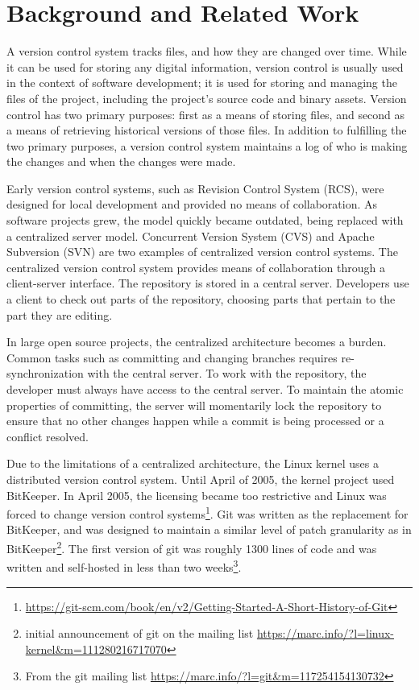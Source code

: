 \chapter{Background and Related Work}\label{chap:background}

A version control system tracks files, and how they are changed over
time.
While it can be used for storing any digital information,
version control is usually used in the context of software development;
it is used for storing and managing the files of the project, including
the project's source code and binary assets.
Version control has two primary purposes: first as a means of storing
files, and second as a means of retrieving historical versions of those
files.
In addition to fulfilling the two primary purposes, a version control
system maintains a log of who is making the changes and when the
changes were made.

Early version control systems, such as Revision Control System (RCS),
were designed for local development and provided no means of collaboration.
As software projects grew, the model quickly became outdated,
being replaced with a centralized server model.
Concurrent Version System (CVS) and Apache Subversion (SVN) are two
examples of centralized version control systems. The centralized version
control system provides means of collaboration through a client-server
interface. The repository is stored in a central server. Developers use
a client to check out parts of the repository, choosing parts that
pertain to the part they are editing.

In large open source projects, the centralized architecture becomes a
burden. Common tasks such as committing and changing branches requires
re-synchronization with the central server.
To work with the repository,
the developer must always have access to the central server.
To maintain the atomic properties of committing, the server will
momentarily lock the repository to ensure that no other changes happen
while a commit is being processed or a conflict resolved.

Due to the limitations of a centralized architecture, the Linux kernel
uses a distributed version control system. Until April of 2005, the
kernel project used BitKeeper.
In April 2005, the licensing became too restrictive and Linux was forced
to change version control
systems\footnote{\url{https://git-scm.com/book/en/v2/Getting-Started-A-Short-History-of-Git}}.
Git was written as the replacement for BitKeeper, and was designed to
maintain a similar level of patch granularity as in BitKeeper\footnote{
  initial announcement of git on the mailing list
  \url{https://marc.info/?l=linux-kernel&m=111280216717070}}. The first
version of git was roughly 1300 lines of code and was written and
self-hosted in less than two weeks\footnote{From the git mailing list
  \url{https://marc.info/?l=git&m=117254154130732}}.

